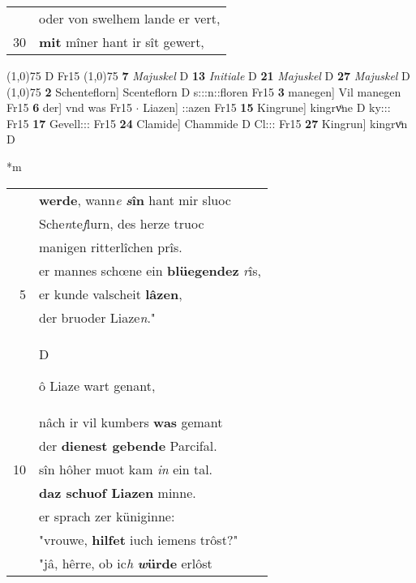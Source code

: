 \documentclass[8pt,a4paper,notitlepage]{article}
\begin{document}
\begin{table}[ht]
\begin{minipage}[t]{0.5\linewidth}
\begin{tabular}{rl}
 & oder von swelhem lande er vert,\\ 
30 & \textbf{mit} mîner hant ir sît gewert,\\ 
\end{tabular}
\scriptsize
\line(1,0){75} \newline
D Fr15 \newline
\line(1,0){75} \newline
\textbf{7} \textit{Majuskel} D  \textbf{13} \textit{Initiale} D  \textbf{21} \textit{Majuskel} D  \textbf{27} \textit{Majuskel} D  \newline
\line(1,0){75} \newline
\textbf{2} Schenteflorn] Scenteflorn D s:::n::floren Fr15 \textbf{3} manegen] Vil manegen Fr15 \textbf{6} der] vnd was Fr15  $\cdot$ Liazen] ::azen Fr15 \textbf{15} Kingrune] kingrvͦne D ky::: Fr15 \textbf{17} Gevell::: Fr15 \textbf{24} Clamide] Chammide D Cl::: Fr15 \textbf{27} Kingrun] kingrvͦn D \newline
\end{minipage}
\hspace{0.5cm}
\begin{minipage}[t]{0.5\linewidth}
\small
\begin{center}*m
\end{center}
\begin{tabular}{rl}
 & \textbf{werde}, wann\textit{e} \textbf{\textit{s}în} hant mir sluoc\\ 
 & Sche\textit{n}te\textit{f}lurn, des herze truoc\\ 
 & manigen ritterlîchen prîs.\\ 
 & er mannes schœne ein \textbf{blüegendez} \textit{r}îs,\\ 
5 & er kunde valscheit \textbf{lâzen},\\ 
 & der bruoder Liaze\textit{n}."\\ 
 & \begin{large}D\end{large}ô Liaze wart genant,\\ 
 & nâch ir vil kumbers \textbf{was} gemant\\ 
 & der \textbf{dienest gebende} Parcifal.\\ 
10 & sîn hôher muot kam \textit{in} ein tal.\\ 
 & \textbf{daz schuof Liazen} minne.\\ 
 & er sprach zer küniginne:\\ 
 & "vrouwe, \textbf{hilfet} iuch iemens trôst?"\\ 
 & "jâ, hêrre, ob ic\textit{h} \textbf{\textit{w}ürde} erlôst\\ 

\end{tabular}
\end{minipage}
\end{table}
\end{document}
